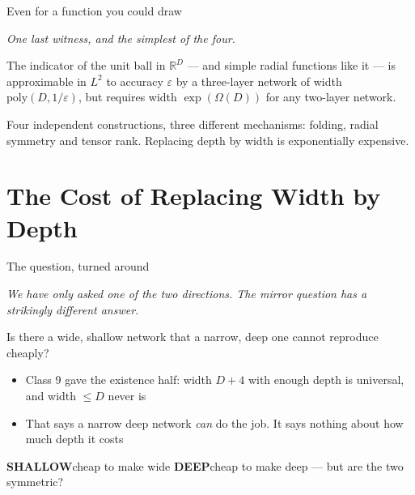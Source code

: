 \documentclass[aspectratio=169, 11pt]{beamer}
\newcommand{\shpar}[2]{%
  \vfill
  {\scriptsize
  \begin{tcolorbox}[enhanced, sidebyside, sidebyside align=top,
                    lefthand ratio=0.485,
                    segmentation style={shc!35, line width=0.6pt},
                    colback=shc!5, colframe=shc!35, boxrule=0.5pt,
                    arc=1.2mm, left=1.6mm, right=1.6mm,
                    top=0.6mm, bottom=0.6mm,
                    before skip=0pt, after skip=0pt]
    {\color{shc}\textbf{SHALLOW}}\hspace{0.55em}#1
  \tcblower
    {\color{dpc}\textbf{DEEP}}\hspace{0.55em}#2
  \end{tcolorbox}}%
  \vspace{0.35em}%
}
\newcommand{\bridge}[1]{%
  {\scriptsize\itshape\color{mcMuted} #1\par}\vspace{0.35em}}
\newcommand{\src}[3]{}      %
\begin{document}
\begin{frame}{Even for a function you could draw}
  \src{safran2017}{section}{3}
  \bridge{One last witness, and the simplest of the four.}
  \vspace{0.4em}
  \begin{theorem}
    {\small The indicator of the unit ball in $\mathbb{R}^{D}$ ---
    and simple radial functions like it --- is approximable in $L^{2}$
    to accuracy $\varepsilon$ by a \alert{three-layer} network of width
    $\mathrm{poly}(D,1/\varepsilon)$, but requires width
    $\exp(\Omega(D))$ for any \alert{two-layer} network.}
  \end{theorem}
  \vspace{0.5em}
  \begin{redhighlight}
    {\small Four independent constructions, three different mechanisms:
    folding, radial symmetry and tensor rank. \alert{Replacing depth by
    width is exponentially expensive.}}
  \end{redhighlight}
\end{frame}

\section{The Cost of Replacing Width by Depth}

\begin{frame}{The question, turned around}
  \src{prince2023}{page}{53}
  \bridge{We have only asked one of the two directions. The mirror
  question has a strikingly different answer.}
  \vspace{0.5em}
  \begin{center}
    {\large Is there a \alert{wide, shallow} network that a
    \alert{narrow, deep} one cannot reproduce cheaply?}
  \end{center}
  \vspace{0.6em}
  {\small
  \begin{itemize}\setlength{\itemsep}{4pt}
    \item Class 9 gave the existence half: width $D+4$ with enough
          depth is universal, and width $\leq D$ never is
    \item That says a narrow deep network \emph{can} do the job. It
          says nothing about \alert{how much depth} it costs
  \end{itemize}}
  \shpar{cheap to make wide}
        {cheap to make deep --- but are the two symmetric?}
\end{frame}
\end{document}
